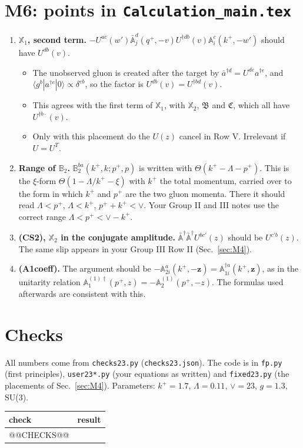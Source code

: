 \documentclass[10pt]{article}
\numberwithin{equation}{section}
\def\mf#1{\mathbb{#1}}
\begin{document}
\section{M6: points in \texttt{Calculation\_main.tex}}\label{sec:main}
\begin{enumerate}
\item \textbf{$\mathbb X_1$, second term.} $-U^{ac}(w')\bar{\mf A}^d_j(q^+,-v)U^{\dagger db}(v)\mf A^c_i(k^+,-w')$ should have $U^{db}(v)$.
\begin{itemize}
\item The unobserved gluon is created after the target by $\bar a^{\dagger d}=U^{de}a^{\dagger e}$, and $\langle g^b|a^{\dagger e}|0\rangle\propto\delta^{eb}$, so the factor is $U^{db}(v)=U^{\dagger bd}(v)$.
\item This agrees with the first term of $\mathbb X_1$, with $\mathbb X_2$, $\mathfrak B$ and $\mathfrak C$, which all have $U^{\dagger b\cdot}(v)$.
\item Only with this placement do the $U(z)$ cancel in Row V. Irrelevant if $U=U^T$.
\end{itemize}
\item \textbf{Range of $\mf B_2$.} $\mf B^{ba}_2(k^+,k;p^+,p)$ is written with $\Theta(k^+-\Lambda-p^+)$. This is the $\xi$-form $\Theta(1-\Lambda/k^+-\xi)$ with $k^+$ the total momentum, carried over to the form in which $k^+$ and $p^+$ are the two gluon momenta. There it should read $\Lambda<p^+$, $\Lambda<k^+$, $p^++k^+<\vee$. Your Group II and III notes use the correct range $\Lambda<p^+<\vee-k^+$.
\item \textbf{(CS2), $\mathbb X_2$ in the conjugate amplitude.} $\bar{\mf A}^\dagger\bar{\mf A}^\dagger U^{bc'}(z)$ should be $U^{c'b}(z)$. The same slip appears in your Group III Row II (Sec.~\ref{sec:M4}).
\item \textbf{(A1coeff).} The argument should be $-\mf A^a_{2i}(k^+,-\mathbf z)=\mf A^{\dagger a}_{1i}(k^+,\mathbf z)$, as in the unitarity relation $\mf A^{(1)\dagger}_1(p^+,z)=-\mf A^{(1)}_2(p^+,-z)$. The formulas used afterwards are consistent with this.
\end{enumerate}

\section{Checks}\label{sec:checks}
All numbers come from \texttt{checks23.py} (\texttt{checks23.json}). The code is in \texttt{fp.py} (first principles), \texttt{user23*.py} (your equations as written) and \texttt{fixed23.py} (the placements of Sec.~\ref{sec:M4}). Parameters: $k^+=1.7$, $\Lambda=0.11$, $\vee=23$, $g=1.3$, SU(3).
\begin{center}\small
\begin{longtable}{@{}p{}p{}@{}}
\toprule
check & result\\ \midrule
@@CHECKS@@
\bottomrule
\end{longtable}
\end{center}
\end{document}
